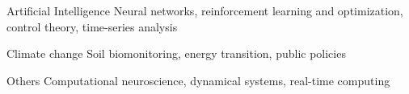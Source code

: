 

\begin{cvskills}

  \cvskill
    {Artificial Intelligence} %
    {Neural networks, reinforcement learning and optimization, control theory, time-series analysis} %

  \cvskill
    {Climate change} %
    {Soil biomonitoring, energy transition, public policies} %

  \cvskill
    {Others} %
    {Computational neuroscience, dynamical systems, real-time computing} %

\end{cvskills}
